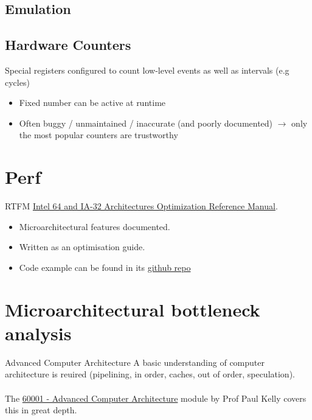 \subsection{Emulation}


\subsection{Hardware Counters}
Special registers configured to count low-level events as well as intervals (e.g cycles)
\begin{itemize}
    \item Fixed number can be active at runtime
    \item Often buggy / unmaintained / inaccurate (and poorly documented) $\to$ only the most popular counters are trustworthy
\end{itemize}

\section{Perf}
\unfinished

\begin{sidenotebox}{RTFM}
    \href{https://www.intel.com/content/dam/doc/manual/64-ia-32-architectures-optimization-manual.pdf}{Intel 64 and IA-32 Architectures Optimization Reference Manual}.
    \begin{itemize}
        \item Microarchitectural features documented.
        \item Written as an optimisation guide.
        \item Code example can be found in its \href{https://github.com/intel/optimization-manual}{github repo}
    \end{itemize}
\end{sidenotebox}

\section{Microarchitectural bottleneck analysis}
\begin{sidenotebox}{Advanced Computer Architecture}
    A basic understanding of computer architecture is reuired (pipelining, in order, caches, out of order, speculation).
    \\
    \\ The \href{\ACAURL}{60001 - Advanced Computer Architecture} module by Prof Paul Kelly covers this in great depth.
\end{sidenotebox}

